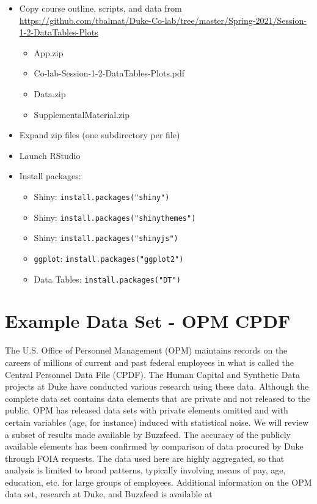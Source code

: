 \documentclass[10pt, letterpaper]{article}
\begin{document}
\begin{spacing}{1.0}
\begin{itemize}
    \item Copy course outline, scripts, and data from \url{https://github.com/tbalmat/Duke-Co-lab/tree/master/Spring-2021/Session-1-2-DataTables-Plots}
    \begin{itemize}[noitemsep]
        \item App.zip
        \item Co-lab-Session-1-2-DataTables-Plots.pdf
        \item Data.zip
        \item SupplementalMaterial.zip
    \end{itemize}
    \item Expand zip files (one subdirectory per file)
    \item Launch RStudio
    \item Install packages:
        \begin{itemize}[noitemsep]
            \item Shiny:  \texttt{install.packages("shiny")}
            \item Shiny:  \texttt{install.packages("shinythemes")}
            \item Shiny:  \texttt{install.packages("shinyjs")}
            \item \texttt{ggplot}:  \texttt{install.packages("ggplot2")}
            \item Data Tables: \texttt{install.packages("DT")}
        \end{itemize}
\end{itemize}


\clearpage

\section{Example Data Set - OPM CPDF}\label{sec:exampledataset}

The U.S. Office of Personnel Management (OPM) maintains records on the careers of millions of current and past federal employees in what is called the Central Personnel Data File (CPDF).  The Human Capital and Synthetic Data projects at Duke have conducted various research using these data.  Although the complete data set contains data elements that are private and not released to the public, OPM has released data sets with private elements omitted and with certain variables (age, for instance) induced with statistical noise.  We will review a subset of results made available by Buzzfeed.  The accuracy of the publicly available elements has been confirmed by comparison of data procured by Duke through FOIA requests.  The data used here are highly aggregated, so that analysis is limited to broad patterns, typically involving means of pay, age, education, etc. for large groups of employees.  Additional information on the OPM data set, research at Duke, and Buzzfeed is available at


\end{spacing}
\end{document}
